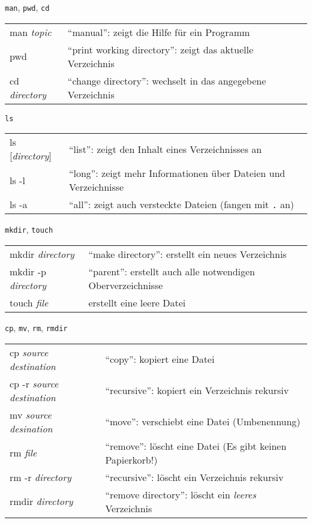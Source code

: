\begin{frame}{\texttt{man}, \texttt{pwd}, \texttt{cd}}
  \begin{tabu}{>{\ttfamily}l X[,L]}
    man \textit{topic}    & \enquote{manual}: zeigt die Hilfe für ein Programm \\
    pwd                   & \enquote{print working directory}: zeigt das aktuelle Verzeichnis \\
    cd \textit{directory} & \enquote{change directory}: wechselt in das angegebene Verzeichnis
  \end{tabu}
\end{frame}

\begin{frame}{\texttt{ls}}
  \begin{tabu}{>{\ttfamily}l X[,L]}
    ls [\textit{directory}] & \enquote{list}: zeigt den Inhalt eines Verzeichnisses an \\
    ls -l                   & \enquote{long}: zeigt mehr Informationen über Dateien und Verzeichnisse \\
    ls -a                   & \enquote{all}: zeigt auch versteckte Dateien (fangen mit \texttt{.} an)
  \end{tabu}
\end{frame}

\begin{frame}{\texttt{mkdir}, \texttt{touch}}
  \begin{tabu}{>{\ttfamily}l X[,L]}
    mkdir \textit{directory}    & \enquote{make directory}: erstellt ein neues Verzeichnis \\
    mkdir -p \textit{directory} & \enquote{parent}: erstellt auch alle notwendigen Oberverzeichnisse \\
    touch \textit{file}         & erstellt eine leere Datei
  \end{tabu}
\end{frame}

\begin{frame}{\texttt{cp}, \texttt{mv}, \texttt{rm}, \texttt{rmdir}}
  \begin{tabu}{>{\ttfamily}l X[,L]}
    cp \textit{source} \textit{destination}    & \enquote{copy}: kopiert eine Datei \\
    cp -r \textit{source} \textit{destination} & \enquote{recursive}: kopiert ein Verzeichnis rekursiv \\
    mv \textit{source} \textit{desination}     & \enquote{move}: verschiebt eine Datei (Umbenennung) \\
    rm \textit{file}                           & \enquote{remove}: löscht eine Datei (Es gibt keinen Papierkorb!) \\
    rm -r \textit{directory}                   & \enquote{recursive}: löscht ein Verzeichnis rekursiv \\
    rmdir \textit{directory}                   & \enquote{remove directory}: löscht ein \emph{leeres} Verzeichnis
  \end{tabu}
\end{frame}

